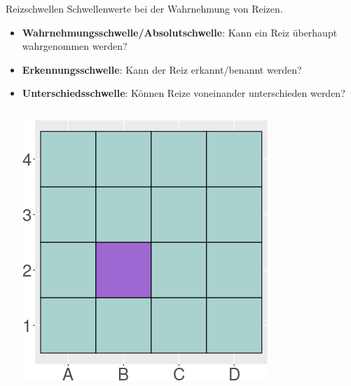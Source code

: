 \documentclass[aspectratio=169]{beamer}
\begin{document}
\begin{frame}{Reizschwellen}
Schwellenwerte bei der Wahrnehmung von Reizen.

\begin{itemize}
    \item 
\textbf{Wahrnehmungsschwelle/Absolutschwelle}: Kann ein Reiz überhaupt wahrgenommen werden? 

\item
\textbf{Erkennungsschwelle}: Kann der Reiz erkannt/benannt werden?


    \item
\textbf{Unterschiedsschwelle}: Können Reize voneinander unterschieden werden? \\[0.2 cm]

    \begin{columns}[c]
    
    \begin{column}{3.2cm}
    \includegraphics[width=\textwidth]{color_test_screenshot_3.png}
    
    \end{column}
    

\end{columns}
\end{itemize}
\end{frame}
\end{document}
